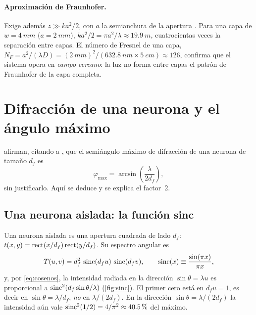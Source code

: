 \paragraph{Aproximación de Fraunhofer.} Exige además $z\gg k a^2/2$, con $a$ la semianchura
de la apertura \parencite[sec.~4.3]{goodman2005}. Para una capa de $w=\SI{4}{mm}$
($a=\SI{2}{mm}$), $ka^2/2=\pi a^2/\lambda\approx\SI{19.9}{m}$, cuatrocientas veces la
separación entre capas. El número de Fresnel de una capa,
$N_F=a^2/(\lambda D)=(\SI{2}{mm})^2/(\SI{632.8}{nm}\times\SI{5}{cm})\approx126$, confirma que el
sistema opera en \emph{campo cercano}: la luz no forma entre capas el patrón de Fraunhofer
de la capa completa.

\section{Difracción de una neurona y el ángulo máximo}\label{sec:neurona}

\textcite{chen2021} afirman, citando a \textcite{lin2018}, que el semiángulo máximo de
difracción de una neurona de tamaño $d_f$ es
\begin{equation}
  \varphi_{\max}=\arcsin\!\left(\frac{\lambda}{2d_f}\right),
  \label{eq:phimax}
\end{equation}
sin justificarlo. Aquí se deduce y se explica el factor~2.

\subsection{Una neurona aislada: la función sinc}

Una neurona aislada es una apertura cuadrada de lado $d_f$: $t(x,y)=\operatorname{rect}(x/d_f)\operatorname{rect}(y/d_f)$.
Su espectro angular es
\begin{equation}
  T(u,v)=d_f^2\,\operatorname{sinc}(d_fu)\,\operatorname{sinc}(d_fv),\qquad \operatorname{sinc}(x)\equiv\frac{\sin(\pi x)}{\pi x},
  \label{eq:sinc}
\end{equation}
y, por \eqref{eq:cosenos}, la intensidad radiada en la dirección $\sin\theta=\lambda u$ es
proporcional a $\operatorname{sinc}^2(d_f\sin\theta/\lambda)$ (\cref{fig:sinc}). El primer cero está en
$d_fu=1$, es decir en $\sin\theta=\lambda/d_f$, \emph{no} en $\lambda/(2d_f)$. En la dirección
$\sin\theta=\lambda/(2d_f)$ la intensidad aún vale $\operatorname{sinc}^2(1/2)=4/\pi^2\approx\SI{40.5}{\percent}$
del máximo.

